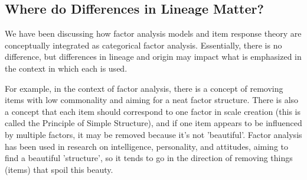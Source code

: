 \documentclass{ltjsbook}
\begin{document}
\subsection{Where do Differences in Lineage Matter?}

We have been discussing how factor analysis models and item response theory are conceptually integrated as categorical factor analysis. Essentially, there is no difference, but differences in lineage and origin may impact what is emphasized in the context in which each is used.

For example, in the context of factor analysis, there is a concept of removing items with low commonality and aiming for a neat factor structure. There is also a concept that each item should correspond to one factor in scale creation (this is called the Principle of Simple Structure), and if one item appears to be influenced by multiple factors, it may be removed because it's not 'beautiful'. Factor analysis has been used in research on intelligence, personality, and attitudes, aiming to find a beautiful 'structure', so it tends to go in the direction of removing things (items) that spoil this beauty.
\end{document}
